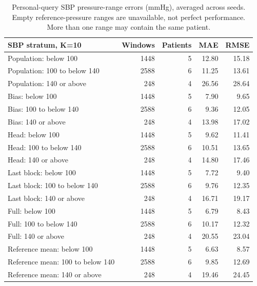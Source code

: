 \documentclass[11pt]{article}
\begin{document}
\begin{table}[!htbp]\centering\scriptsize
\begin{tabular}{lrrrr}\toprule
SBP stratum, K=10 & Windows & Patients & MAE & RMSE\\\midrule
Population: below 100 & 1448 & 5 & 12.80 & 15.18\\
Population: 100 to below 140 & 2588 & 6 & 11.25 & 13.61\\
Population: 140 or above & 248 & 4 & 26.56 & 28.64\\
Bias: below 100 & 1448 & 5 & 7.90 & 9.65\\
Bias: 100 to below 140 & 2588 & 6 & 9.36 & 12.05\\
Bias: 140 or above & 248 & 4 & 13.98 & 17.02\\
Head: below 100 & 1448 & 5 & 9.62 & 11.41\\
Head: 100 to below 140 & 2588 & 6 & 10.51 & 13.65\\
Head: 140 or above & 248 & 4 & 14.80 & 17.46\\
Last block: below 100 & 1448 & 5 & 7.72 & 9.40\\
Last block: 100 to below 140 & 2588 & 6 & 9.76 & 12.35\\
Last block: 140 or above & 248 & 4 & 16.71 & 19.17\\
Full: below 100 & 1448 & 5 & 6.79 & 8.43\\
Full: 100 to below 140 & 2588 & 6 & 10.17 & 12.32\\
Full: 140 or above & 248 & 4 & 20.55 & 23.04\\
Reference mean: below 100 & 1448 & 5 & 6.63 & 8.57\\
Reference mean: 100 to below 140 & 2588 & 6 & 9.85 & 12.69\\
Reference mean: 140 or above & 248 & 4 & 19.46 & 24.45\\
\bottomrule\end{tabular}
\caption{Personal-query SBP pressure-range errors (mmHg), averaged across seeds. Empty reference-pressure ranges are unavailable, not perfect performance. More than one range may contain the same patient.}\end{table}
\end{document}
